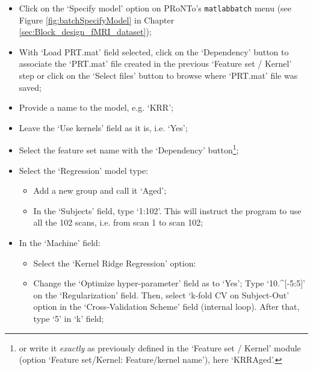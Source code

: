 \begin{itemize}

\item Click on the `Specify model' option on PRoNTo's {\tt matlabbatch} menu (see Figure \ref{fig:batchSpecifyModel} in Chapter \ref{sec:Block_design_fMRI_dataset});
	
\item With `Load PRT.mat' field selected, click on the `Dependency' button to associate the `PRT.mat' file created in the previous `Feature set / Kernel' step or click on the `Select files' button to browse where `PRT.mat' file was saved;

\item Provide a name to the model, e.g. `KRR';   

\item Leave the `Use kernels' field as it is, i.e. `Yes';    

\item Select the feature set name with the `Dependency' button\footnote{or write it {\it exactly} as previously defined in the `Feature set / Kernel' module (option `Feature set/Kernel: Feature/kernel name'), here `KRRAged'.};    
    
\item Select the `Regression' model type:
	
		\begin{itemize}
		
    		\item Add a new group and call it `Aged';
		
		   \item In the `Subjects' field, type `1:102'. This will instruct the program to use all the 102 scans, i.e. from scan 1 to scan 102;
		    \end{itemize}		
		
	\item In the `Machine' field:
	
	\begin{itemize}
   \item Select the `Kernel Ridge Regression' option:
	
	\item Change the `Optimize hyper-parameter' field as to `Yes'; Type `10.\textasciicircum{}[-5:5]' on the `Regularization' field. Then, select `k-fold CV on Subject-Out' option in the `Cross-Validation Scheme' field (internal loop).
	After that, type `5' in `k' field;
		
	\end{itemize}
	

\end{itemize}

